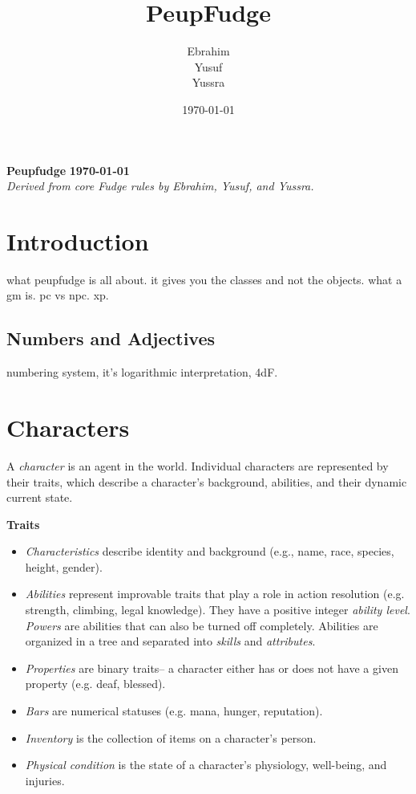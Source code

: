 \documentclass[12pt]{article}
\title{PeupFudge}
\author{Ebrahim \\ Yusuf \\ Yussra}
\date{\today}
\newcommand{\notes}[1]{{\color{Tan} #1}}
\begin{document}
\textbf{Peupfudge}
\hfill
\textbf{\today}\\
\textit{Derived from core Fudge rules by Ebrahim, Yusuf, and Yussra.}

\section{Introduction}
\notes{what peupfudge is all about.
it gives you the classes and not the objects.
what a gm is.
pc vs npc.
xp.}

\subsection{Numbers and Adjectives} \label{sec:quant}

\notes{
numbering system, it's logarithmic interpretation, 4dF.
}

\section{Characters}
A \emph{character}
 is an agent in the world.
Individual characters are represented by their traits,
which describe a character's background, abilities, and their dynamic current state.

\textbf{Traits}\vspace{-1em}
\begin{itemize}
\item \emph{Characteristics}
describe identity and background
(e.g., name, race, species, height, gender).
\item \emph{Abilities}
represent improvable traits that play a role in action resolution
(e.g. strength, climbing, legal knowledge).
They have a positive integer \emph{ability level}.
\emph{Powers} are abilities that can also be turned off completely.
Abilities are organized in a tree and separated into \emph{skills} and \emph{attributes}.
\item \emph{Properties} are binary traits-- a character either has or does not have a given property
(e.g. deaf, blessed).
\item \emph{Bars} are numerical statuses (e.g. mana, hunger, reputation).
\item \emph{Inventory} is the collection of items on a character's person.
\item \emph{Physical condition} is the state of a character's physiology, well-being, and injuries.
\end{itemize}
\end{document}

